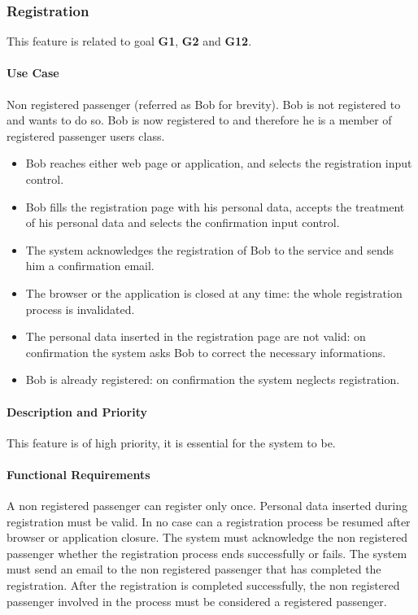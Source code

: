\subsubsection{Registration}
This feature is related to goal \textbf{G1}, \textbf{G2} and \textbf{G12}.
\paragraph{Use Case}
\begin{itemize}
	 Non registered passenger (referred as Bob for brevity).
	 Bob is not registered to \myTaxiService{} and wants to do so.
	 Bob is now registered to \myTaxiService{} and therefore he is a member of registered passenger users class.
	\begin{itemize}
		\item Bob reaches either \myTaxiService{} web page or application, and selects the registration input control.
		\item Bob fills the registration page with his personal data, accepts the treatment of his personal data and selects the confirmation input control.
		\item The system acknowledges the registration of Bob to the service and sends him a confirmation email.
	\end{itemize}
	\begin{itemize}
		\item The browser or the application is closed at any time: the whole registration process is invalidated.
		\item The personal data inserted in the registration page are not valid: on confirmation the system asks Bob to correct the necessary informations.
		\item Bob is already registered: on confirmation the system neglects registration.
	\end{itemize}
\end{itemize}
\paragraph{Description and Priority}
This feature is of high priority, it is essential for the system to be.\par
\paragraph{Functional Requirements}
\begin{itemize}
	 A non registered passenger can register only once.
	 Personal data inserted during registration must be valid.
	 In no case can a registration process be resumed after browser or application closure.
	 The system must acknowledge the non registered passenger whether the registration process ends successfully or fails.
	 The system must send an email to the non registered passenger that has completed the registration.
	 After the registration is completed successfully, the non registered passenger involved in the process must be considered a registered passenger.
\end{itemize}
